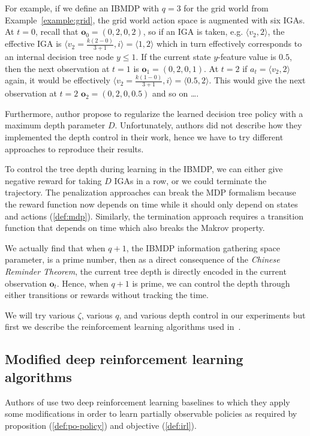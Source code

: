 For example, if we define an IBMDP with $q=3$ for the grid world from Example~\ref{example:grid}, the grid world action space is augmented with six IGAs. 
At $t=0$, recall that $\boldsymbol{o}_0=(0, 2, 0, 2)$, so if an IGA is taken, e.g. $\langle v_2, 2 \rangle$, the effective IGA is $\langle v_2=\frac{k(2-0)}{3+1}, i \rangle = \langle 1, 2 \rangle$ which in turn effectively corresponds to an internal decision tree node $y \leq 1$.
If the current state $y$-feature value is $0.5$, then the next observation at $t=1$ is $\boldsymbol{o}_1=(0, 2, 0, 1)$. At $t=2$ if $a_t=\langle v_2, 2 \rangle$ again, it would be effectively $\langle v_2=\frac{k(1-0)}{3+1}, i \rangle = \langle 0.5, 2 \rangle$. 
This would give the next observation at $t=2$ $\boldsymbol{o}_2=(0, 2, 0, 0.5)$ and so on \dots. 

Furthermore, author propose to regularize the learned decision tree policy with a maximum depth parameter $D$.
Unfortunately, authors did not describe how they implemented the depth control in their work, hence we have to try different approaches to reproduce their results.

To control the tree depth during learning in the IBMDP, we can either give negative reward for taking $D$ IGAs in a row, or we could terminate the trajectory. 
The penalization approaches can break the MDP formalism because the reward function now depends on time while it should only depend on states and actions (\ref{def:mdp}).
Similarly, the termination approach requires a transition function that depends on time which also breaks the Makrov property.

We actually find that when $q+1$, the IBMDP information gathering space parameter, is a prime number, then as a direct consequence of the \textit{Chinese Reminder Theorem}, the current tree depth is directly encoded in the current observation $\boldsymbol{o}_t$. 
Hence, when $q+1$ is prime, we can control the depth through either transitions or rewards without tracking the time.

We will try various $\zeta$, various $q$, and various depth control in our experiments but first we describe the reinforcement learning algorithms used in~\cite{topin2021iterative}.

\subsection{Modified deep reinforcement learning algorithms}
Authors of \cite{topin2021iterative} use two deep reinforcement learning baselines to which they apply some modifications in order to learn partially observable policies as required by proposition (\ref{def:po-policy}) and objective (\ref{def:irl}).

